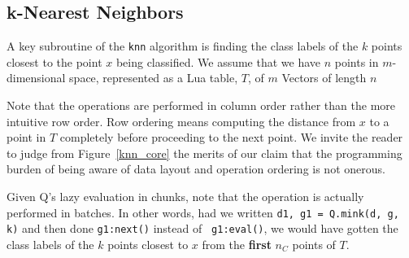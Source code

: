 \subsection{k-Nearest Neighbors}
\label{knn}

A key subroutine of the {\tt knn} algorithm \cite{Hastie2009} is finding the class labels of the
\(k\) points closest to the point \(x\) being classified. 
We assume that we have \(n\) points in \(m\)-dimensional space, represented as a
Lua table, \(T\), of \(m\) Vectors of length \(n\)

Note that the operations are performed in column
order rather than the more intuitive row order. Row ordering means computing the
distance from \(x\) to a point in \(T\) completely before proceeding to the next
point. We invite the reader to judge from Figure~\ref{knn_core} the merits of our claim that the programming burden of being aware of data layout and
operation ordering is not onerous.

Given Q's lazy evaluation in chunks, note that the operation is actually
performed in batches. In other words, had we written 
{\tt d1, g1 = Q.mink(d, g, k)} and then done {\tt g1:next()} instead  of {\tt
g1:eval()}, 
we would have gotten the class labels of the \(k\) points
closest to \(x\) from the {\bf first} \(n_C\) points of \(T\). 

\begin{figure}[hbtp]
\centering
{}
\end{figure}


